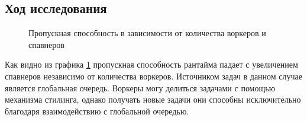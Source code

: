 \subsection{Ход исследования}

\begin{figure}[H]
    \begin{center}
    \end{center}

    \caption{Пропускная способность в зависимости от количества воркеров и спавнеров}
    \label{fig:tatlin:line:nspawn:5000}
\end{figure}

Как видно из графика \ref{fig:tatlin:line:nspawn:5000} пропускная способность рантайма падает с увеличением спавнеров независимо от количества воркеров. Источником задач в данном случае является глобальная очередь. Воркеры могу делиться задачами с помощью механизма стилинга, однако получать новые задачи они способны исключительно благодаря взаимодействию с глобальной очередью.
